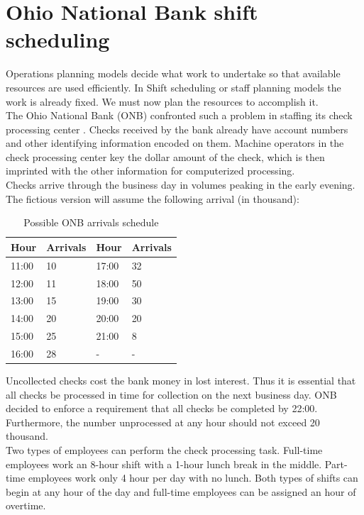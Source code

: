 \documentclass[a4paper,10 pt,titlepage,twoside]{book}
\theoremstyle{plain}
\theoremstyle{definition}
\theoremstyle{remark}
\begin{document}
\section{Ohio National Bank shift scheduling}
Operations planning models decide what work to undertake so that available resources are used efficiently. In Shift scheduling or staff planning models the work is already fixed. We must now plan the resources to accomplish it.\\
The Ohio National Bank (ONB) confronted such a problem in staffing its check processing center \cite{ONB}. Checks received by the bank already have account numbers and other identifying information encoded on them. Machine operators in the check processing center key the dollar  amount of the check, which is then imprinted with the other information for computerized processing.\\Checks arrive through the business day in volumes peaking in the early evening. The fictious version will assume the following arrival (in thousand):
\begin{table}[H]\caption{\label{table:shiftscheduling}Possible ONB arrivals schedule}
	\begin{center}
	\begin{tabular}{ll|ll}
		\hline
		\textbf{Hour} & \textbf{Arrivals} & \textbf{Hour} & \textbf{Arrivals} \\ \hline
		11:00 & 10 & 17:00 & 32 \\
		12:00 & 11 & 18:00 & 50 \\
		13:00 & 15 & 19:00 & 30 \\
		14:00 & 20 & 20:00 & 20 \\
		15:00 & 25 & 21:00 & 8 \\
		16:00 & 28 & - & -   \\ \hline
	\end{tabular}
\end{center}
\end{table}
Uncollected checks cost the bank money in lost interest. Thus it is essential that all checks be processed in time for collection on the next business day. ONB decided to enforce a requirement that all checks be completed by 22:00. Furthermore, the number unprocessed at any hour should not exceed 20 thousand. \\
Two types of employees can perform the check processing task. Full-time employees work an 8-hour shift with a 1-hour lunch break in the middle. Part-time employees work only 4 hour per day with no lunch. Both types of shifts can begin at any hour of the day and full-time employees can be assigned an hour of overtime.\\
\end{document}
